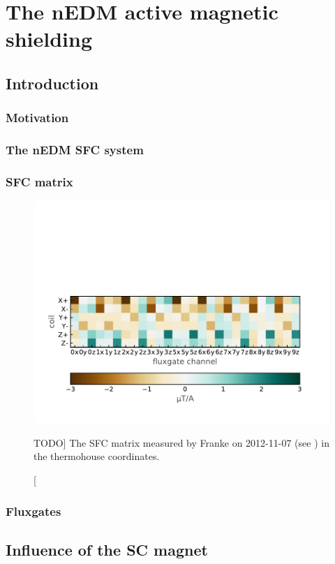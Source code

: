 \chapter{The nEDM active magnetic shielding}

\label{ch:nedm_sfc}


\section{Introduction}
\cite{Franke2013}

\subsection{Motivation}

\subsection{The nEDM SFC system}

\subsection{SFC matrix}
\begin{figure}[bth]
  \myfloatalign
  \includegraphics[width=.8\linewidth]{gfx/nEDM_SFC/nEDM_SFC_matrix}
  \caption
  [TODO]
  {The SFC matrix measured by Franke on 2012-11-07 (see \cite{Franke2013}) in the thermohouse coordinates.}
  \label{fig:nEDM_SFC_matrix}
\end{figure}

\subsection{Fluxgates}

\section{Influence of the SC magnet}



